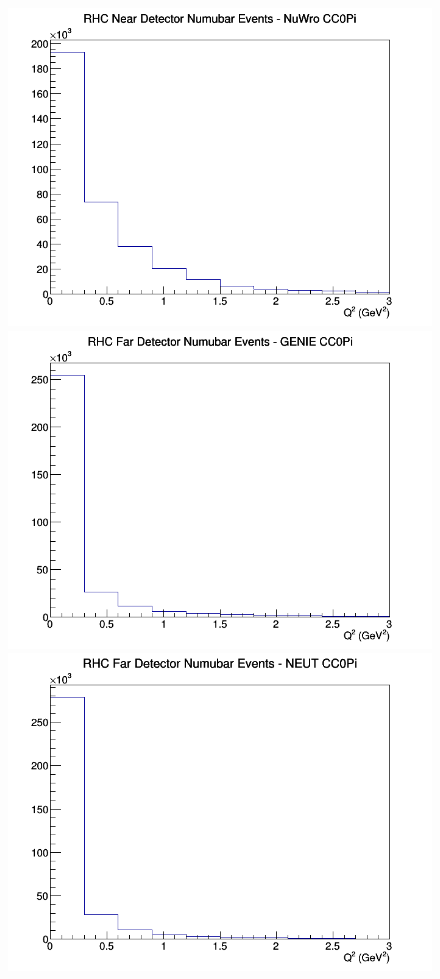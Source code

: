 \begin{figure}[h]
\includegraphics[width=\linewidth]{eff_Q2/FGT/CC0Pi_RHC_ND_numubar_Q2_NuWro.png}
\endminipage
\newline
{}
\includegraphics[width=\linewidth]{eff_Q2/FGT/CC0Pi_RHC_FD_numubar_Q2_GENIE.png}
\endminipage
{}
\includegraphics[width=\linewidth]{eff_Q2/FGT/CC0Pi_RHC_FD_numubar_Q2_NEUT.png}

\end{figure}
